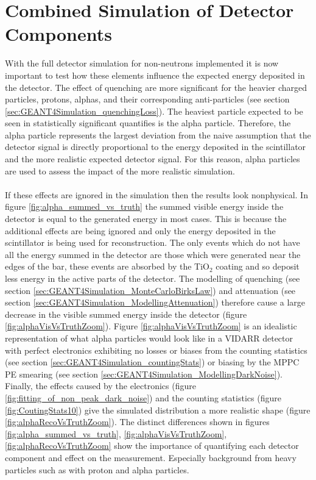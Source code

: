 \section{Combined Simulation of Detector Components}\label{sec:GEANT4Simulation_resultsPhysicalElectronics}
With the full detector simulation for non-neutrons implemented it is now important to test how these elements influence the expected energy deposited in the detector. The effect of quenching are more significant for the heavier charged particles, protons, alphas, and their corresponding anti-particles (see section \ref{sec:GEANT4Simulation_quenchingLoss}). The heaviest particle expected to be seen in statistically significant quantifies is the alpha particle. Therefore, the alpha particle represents the largest deviation from the naive assumption that the detector signal is directly proportional to the energy deposited in the scintillator and the more realistic expected detector signal. For this reason, alpha particles are used to assess the impact of the more realistic simulation.  
\\\\If these effects are ignored in the simulation then the results look nonphysical. In figure \ref{fig:alpha_summed_vs_truth} the summed visible energy inside the detector is equal to the generated energy in most cases. This is because the additional effects are being ignored and only the energy deposited in the scintillator is being used for reconstruction. The only events which do not have all the energy summed in the detector are those which were generated near the edges of the bar, these events are absorbed by the TiO$_2$ coating and so deposit less energy in the active parts of the detector. The modelling of quenching (see section \ref{sec:GEANT4Simulation_MonteCarloBirksLaw}) and attenuation (see section \ref{sec:GEANT4Simulation_ModellingAttenuation}) therefore cause a large decrease in the visible summed energy inside the detector (figure \ref{fig:alphaVisVsTruthZoom}). Figure \ref{fig:alphaVisVsTruthZoom} is an idealistic representation of what alpha particles would look like in a VIDARR detector with perfect electronics exhibiting no losses or biases from the counting statistics (see section \ref{sec:GEANT4Simulation_countingStats}) or biasing by the MPPC PE smearing (see section \ref{sec:GEANT4Simulation_ModellingDarkNoise}). Finally, the effects caused by the electronics (figure \ref{fig:fitting_of_non_peak_dark_noise}) and the counting statistics (figure \ref{fig:CoutingStats10}) give the simulated distribution a more realistic shape (figure \ref{fig:alphaRecoVsTruthZoom}). The distinct differences shown in figures \ref{fig:alpha_summed_vs_truth}, \ref{fig:alphaVisVsTruthZoom}, \ref{fig:alphaRecoVsTruthZoom} show the importance of quantifying each detector component and effect on the measurement. Especially background from heavy particles such as with proton and alpha particles. %


